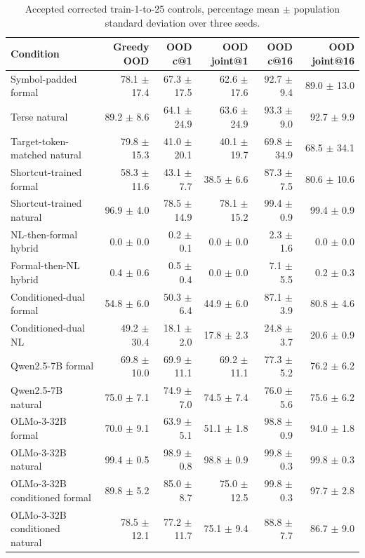 \documentclass[10pt]{article}
\begin{document}
\begin{table}[H]
\centering
\scriptsize
\begin{tabular}{lrrrrr}
\toprule
Condition & Greedy OOD & OOD c@1 & OOD joint@1 & OOD c@16 & OOD joint@16 \\
\midrule
Symbol-padded formal & 78.1 $\pm$ 17.4 & 67.3 $\pm$ 17.5 & 62.6 $\pm$ 17.6 & 92.7 $\pm$ 9.4 & 89.0 $\pm$ 13.0 \\
Terse natural & 89.2 $\pm$ 8.6 & 64.1 $\pm$ 24.9 & 63.6 $\pm$ 24.9 & 93.3 $\pm$ 9.0 & 92.7 $\pm$ 9.9 \\
Target-token-matched natural & 79.8 $\pm$ 15.3 & 41.0 $\pm$ 20.1 & 40.1 $\pm$ 19.7 & 69.8 $\pm$ 34.9 & 68.5 $\pm$ 34.1 \\
Shortcut-trained formal & 58.3 $\pm$ 11.6 & 43.1 $\pm$ 7.7 & 38.5 $\pm$ 6.6 & 87.3 $\pm$ 7.5 & 80.6 $\pm$ 10.6 \\
Shortcut-trained natural & 96.9 $\pm$ 4.0 & 78.5 $\pm$ 14.9 & 78.1 $\pm$ 15.2 & 99.4 $\pm$ 0.9 & 99.4 $\pm$ 0.9 \\
NL-then-formal hybrid & 0.0 $\pm$ 0.0 & 0.2 $\pm$ 0.1 & 0.0 $\pm$ 0.0 & 2.3 $\pm$ 1.6 & 0.0 $\pm$ 0.0 \\
Formal-then-NL hybrid & 0.4 $\pm$ 0.6 & 0.5 $\pm$ 0.4 & 0.0 $\pm$ 0.0 & 7.1 $\pm$ 5.5 & 0.2 $\pm$ 0.3 \\
Conditioned-dual formal & 54.8 $\pm$ 6.0 & 50.3 $\pm$ 6.4 & 44.9 $\pm$ 6.0 & 87.1 $\pm$ 3.9 & 80.8 $\pm$ 4.6 \\
Conditioned-dual NL & 49.2 $\pm$ 30.4 & 18.1 $\pm$ 2.0 & 17.8 $\pm$ 2.3 & 24.8 $\pm$ 3.7 & 20.6 $\pm$ 0.9 \\
Qwen2.5-7B formal & 69.8 $\pm$ 10.0 & 69.9 $\pm$ 11.1 & 69.2 $\pm$ 11.1 & 77.3 $\pm$ 5.2 & 76.2 $\pm$ 6.2 \\
Qwen2.5-7B natural & 75.0 $\pm$ 7.1 & 74.9 $\pm$ 7.0 & 74.5 $\pm$ 7.4 & 76.0 $\pm$ 5.6 & 75.6 $\pm$ 6.2 \\
OLMo-3-32B formal & 70.0 $\pm$ 9.1 & 63.9 $\pm$ 5.1 & 51.1 $\pm$ 1.8 & 98.8 $\pm$ 0.9 & 94.0 $\pm$ 1.8 \\
OLMo-3-32B natural & 99.4 $\pm$ 0.5 & 98.9 $\pm$ 0.8 & 98.8 $\pm$ 0.9 & 99.8 $\pm$ 0.3 & 99.8 $\pm$ 0.3 \\
OLMo-3-32B conditioned formal & 89.8 $\pm$ 5.2 & 85.0 $\pm$ 8.7 & 75.0 $\pm$ 12.5 & 99.8 $\pm$ 0.3 & 97.7 $\pm$ 2.8 \\
OLMo-3-32B conditioned natural & 78.5 $\pm$ 12.1 & 77.2 $\pm$ 11.7 & 75.1 $\pm$ 9.4 & 88.8 $\pm$ 7.7 & 86.7 $\pm$ 9.0 \\
\bottomrule
\end{tabular}
\caption{Accepted corrected train-1-to-25 controls, percentage mean $\pm$ population standard
deviation over three seeds.}
\end{table}
\end{document}
